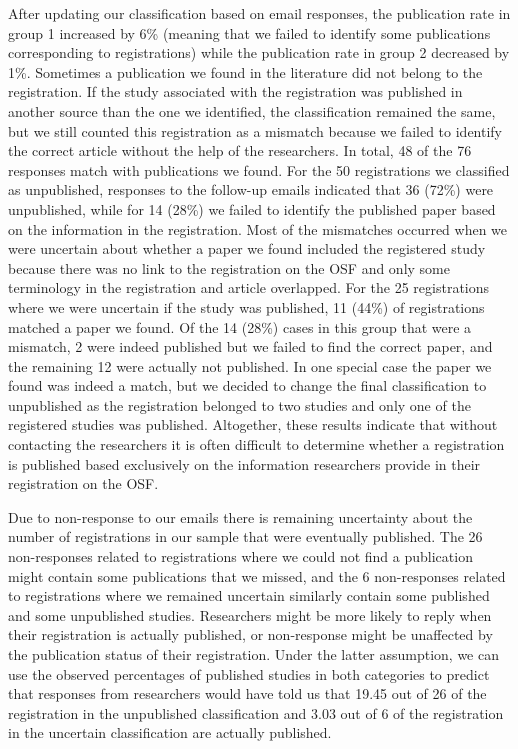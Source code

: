 \documentclass[
  ,jou, a4paper,floatsintext]{apa6}
\begin{document}
After updating our classification based on email responses, the publication rate in group 1 increased by 6\% (meaning that we failed to identify some publications corresponding to registrations) while the publication rate in group 2 decreased by 1\%. Sometimes a publication we found in the literature did not belong to the registration. If the study associated with the registration was published in another source than the one we identified, the classification remained the same, but we still counted this registration as a mismatch because we failed to identify the correct article without the help of the researchers. In total, 48 of the 76 responses match with publications we found. For the 50 registrations we classified as unpublished, responses to the follow-up emails indicated that 36 (72\%) were unpublished, while for 14 (28\%) we failed to identify the published paper based on the information in the registration. Most of the mismatches occurred when we were uncertain about whether a paper we found included the registered study because there was no link to the registration on the OSF and only some terminology in the registration and article overlapped. For the 25 registrations where we were uncertain if the study was published, 11 (44\%) of registrations matched a paper we found. Of the 14 (28\%) cases in this group that were a mismatch, 2 were indeed published but we failed to find the correct paper, and the remaining 12 were actually not published. In one special case the paper we found was indeed a match, but we decided to change the final classification to unpublished as the registration belonged to two studies and only one of the registered studies was published. Altogether, these results indicate that without contacting the researchers it is often difficult to determine whether a registration is published based exclusively on the information researchers provide in their registration on the OSF.

Due to non-response to our emails there is remaining uncertainty about the number of registrations in our sample that were eventually published. The 26 non-responses related to registrations where we could not find a publication might contain some publications that we missed, and the 6 non-responses related to registrations where we remained uncertain similarly contain some published and some unpublished studies. Researchers might be more likely to reply when their registration is actually published, or non-response might be unaffected by the publication status of their registration. Under the latter assumption, we can use the observed percentages of published studies in both categories to predict that responses from researchers would have told us that 19.45 out of 26 of the registration in the unpublished classification and 3.03 out of 6 of the registration in the uncertain classification are actually published.
\end{document}
